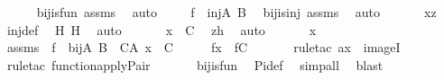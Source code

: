 \begin{isabellebody}
\ \ \ \ \isamarkupfalse%
\ bij{\isacharunderscore}{\kern0pt}is{\isacharunderscore}{\kern0pt}fun\ assms\ \isamarkupfalse%
\ auto\ \isanewline
\ \ \isamarkupfalse%
\ {\isachardoublequoteopen}f\ {\isasymin}\ inj{\isacharparenleft}{\kern0pt}A{\isacharcomma}{\kern0pt}\ B{\isacharparenright}{\kern0pt}{\isachardoublequoteclose}\ \isamarkupfalse%
\ bij{\isacharunderscore}{\kern0pt}is{\isacharunderscore}{\kern0pt}inj\ assms\ \isamarkupfalse%
\ auto\ \isanewline
\ \ \isamarkupfalse%
\ \isamarkupfalse%
\ {\isachardoublequoteopen}x{\isacharequal}{\kern0pt}z{\isachardoublequoteclose}\ \isamarkupfalse%
\ inj{\isacharunderscore}{\kern0pt}def\ \isamarkupfalse%
\ H\ H{}\ \isamarkupfalse%
\ auto\ \isanewline
\ \ \isamarkupfalse%
\ \isamarkupfalse%
\ {\isachardoublequoteopen}x\ {\isasymin}\ C{\isachardoublequoteclose}\ \isamarkupfalse%
\ zh\ \isamarkupfalse%
\ auto\ \isanewline
{}\isamarkupfalse%
\ \isanewline
\ \ \isamarkupfalse%
\ x\ \isamarkupfalse%
\ assms\ {\isacharcolon}{\kern0pt}\ {\isachardoublequoteopen}f\ {\isasymin}\ bij{\isacharparenleft}{\kern0pt}A{\isacharcomma}{\kern0pt}\ B{\isacharparenright}{\kern0pt}\ {\isachardoublequoteclose}\ {\isachardoublequoteopen}C{\isasymsubseteq}A{\isachardoublequoteclose}\ {\isachardoublequoteopen}x\ {\isasymin}\ C{\isachardoublequoteclose}\isanewline
\ \ \isamarkupfalse%
\ \isamarkupfalse%
\ {\isachardoublequoteopen}f{\isacharbackquote}{\kern0pt}x\ {\isasymin}\ f{\isacharbackquote}{\kern0pt}{\isacharbackquote}{\kern0pt}C{\isachardoublequoteclose}\ \isanewline
\ \ \ \ \isamarkupfalse%
\ {\isacharparenleft}{\kern0pt}rule{\isacharunderscore}{\kern0pt}tac\ a{\isacharequal}{\kern0pt}x\ \ imageI{\isacharparenright}{\kern0pt}\ \isanewline
\ \ \ \ \isamarkupfalse%
\ {\isacharparenleft}{\kern0pt}rule{\isacharunderscore}{\kern0pt}tac\ function{\isacharunderscore}{\kern0pt}apply{\isacharunderscore}{\kern0pt}Pair{\isacharparenright}{\kern0pt}\ \isanewline
\ \ \ \ \isamarkupfalse%
\ bij{\isacharunderscore}{\kern0pt}is{\isacharunderscore}{\kern0pt}fun\ \isamarkupfalse%
\ Pi{\isacharunderscore}{\kern0pt}def\ \isamarkupfalse%
\ simp{\isacharunderscore}{\kern0pt}all\ \isamarkupfalse%
\ blast\ \isamarkupfalse%

\end{isabellebody}
